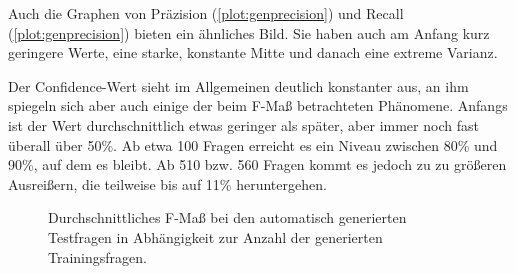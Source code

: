Auch die Graphen von Präzision (\cref{plot:genprecision}) und Recall (\cref{plot:genprecision}) bieten ein ähnliches Bild.
Sie haben auch am Anfang kurz geringere Werte, eine starke, konstante Mitte und danach eine extreme Varianz.

Der Confidence-Wert sieht im Allgemeinen deutlich konstanter aus, an ihm spiegeln sich aber auch einige der beim F-Maß betrachteten Phänomene.
Anfangs ist der Wert durchschnittlich etwas geringer als später, aber immer noch fast überall über 50\%.
Ab etwa 100 Fragen erreicht es ein Niveau zwischen 80\% und 90\%, auf dem es bleibt.
Ab 510 bzw. 560 Fragen kommt es jedoch zu zu größeren Ausreißern, die teilweise bis auf 11\% heruntergehen.

\begin{figure}%
  \begin{center}
    \caption{Durchschnittliches F-Maß bei den automatisch generierten Testfragen in Abhängigkeit zur Anzahl der generierten Trainingsfragen.}\label{plot:genfscore}
  \end{center}
\end{figure}

